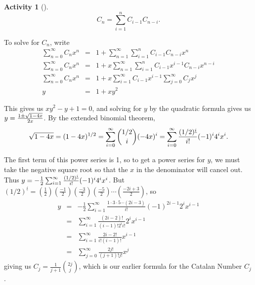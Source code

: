 \documentclass[10pt,]{book}
\theoremstyle{plain}
\theoremstyle{definition}
\newtheorem{activity}[project]{Activity}
\numberwithin{equation}{chapter}
\newcommand{\amp}{&}
\begin{document}
\begin{activity}[]
\begin{equation*}
C_n=\sum_{i=1}^nC_{i-1}C_{n-i}.
\end{equation*}
%
\par
To solve for \(C_n\), write%
\begin{align*}
\sum_{n=0}^\infty C_nx^n \amp =\amp 1+\sum_{n=1}^\infty\sum_{i=1}^nC_{i-1}C_{n-i}x^n\\
\sum_{n=0}^\infty C_nx^n
\amp =\amp 1+x\sum_{n=1}^\infty\sum_{i=1}^nC_{i-1}x^{i-1}C_{n-i}x^{n-i}\\
\sum_{n=0}^\infty C_nx^n
\amp =\amp 1+x\sum_{i=1}^\infty C_{i-1}x^{i-1}\sum_{j=0}^\infty C_{j}x^{j}\\
y\amp =\amp 1 + xy^2
\end{align*}
%
\par
This gives us \(xy^2-y+1=0\), and solving for \(y\) by the quadratic formula gives us \(y={1\pm \sqrt{1-4x}\over 2x}\). By the extended binomial theorem,%
\begin{equation*}
\sqrt{1-4x}=(1-4x)^{1/2} = \sum_{i=0}^\infty \binom{1/2}{i}(-4x)^i=
\sum_{i=0}^\infty {(1/2)^{\underline{i}}\over i!}(-1)^i4^ix^i.
\end{equation*}
%
\par
The first term of this power series is 1, so to get a power series for \(y\), we must take the negative square root so that the \(x\) in the denominator will cancel out. Thus \(y=-\frac{1}{2}\sum_{i=1}^\infty {(1/2)^{\underline{i}}\over i!}(-1)^i4^ix^i\). But \((1/2)^{\underline{i}}=(\frac{1}{2})(\frac{-1}{2})(\frac{-3}{2})(\frac{-5}{2})\cdots (\frac{-2i+3}{2})\), so%
\begin{align*}
y\amp =\amp -\frac{1}{2}\sum_{i=1}^\infty\frac{1\cdot3\cdot5\cdots(2i-3)}{i!}(-1)^{2i-1}2^ix^{i-1}\\
\amp =\amp  \sum_{i=1}^\infty \frac{(2i-2)!}{(i-1)!2^{i}i!}2^ix^{i-1}\\
\amp =\amp  \sum_{i=1}^\infty\frac{2i-2!}{i!(i-1)!}x^{i-1}\\
\amp =\amp \sum_{j=0}^\infty\frac{2j!}{(j+1)!j!}x^j
\end{align*}
giving us \(C_j=\frac{1}{j+1}\binom{2j}{j}\), which is our earlier formula for the Catalan Number \(C_j\).%
\end{activity}
\typeout{************************************************}
\typeout{************************************************}
\end{document}
